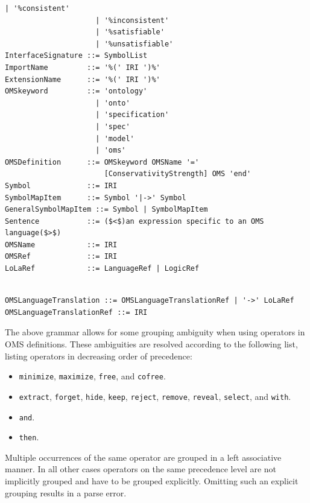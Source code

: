 \documentclass[10pt, a4paper]{isov2}
\newcommand*{\syntax}[1]{\texttt{#1}}
\begin{document}
\begin{lstlisting}[language=ebnf,escapeinside={()},mathescape]
                     | '%consistent'
                     | '%inconsistent'
                     | '%satisfiable'
                     | '%unsatisfiable'
InterfaceSignature ::= SymbolList
ImportName         ::= '%(' IRI ')%'
ExtensionName      ::= '%(' IRI ')%'
OMSkeyword         ::= 'ontology'
                     | 'onto'
                     | 'specification'
                     | 'spec'
                     | 'model'
                     | 'oms'
OMSDefinition      ::= OMSkeyword OMSName '='
                       [ConservativityStrength] OMS 'end'
Symbol             ::= IRI
SymbolMapItem      ::= Symbol '|->' Symbol
GeneralSymbolMapItem ::= Symbol | SymbolMapItem
Sentence           ::= ($<$)an expression specific to an OMS language($>$) 
OMSName            ::= IRI
OMSRef             ::= IRI
LoLaRef            ::= LanguageRef | LogicRef
\end{lstlisting}


\begin{lstlisting}[language=ebnf,mathescape]

OMSLanguageTranslation ::= OMSLanguageTranslationRef | '->' LoLaRef
OMSLanguageTranslationRef ::= IRI
\end{lstlisting}



The above grammar allows for some grouping ambiguity when using operators in
OMS definitions. These ambiguities are resolved according to the following
list, listing operators in decreasing order of precedence:
\begin{itemize}
  \item \syntax{minimize}, \syntax{maximize}, \syntax{free}, and \syntax{cofree}. 
  \item \syntax{extract}, \syntax{forget}, \syntax{hide}, \syntax{keep},
    \syntax{reject}, \syntax{remove}, \syntax{reveal}, \syntax{select}, and
    \syntax{with}.
  \item \syntax{and}.
  \item \syntax{then}.
\end{itemize}
Multiple occurrences of the same operator are grouped in a left associative
manner. In all other cases operators on the same precedence level are not
implicitly grouped and have to be grouped explicitly. Omitting such an explicit
grouping results in a parse error.

\end{document}

